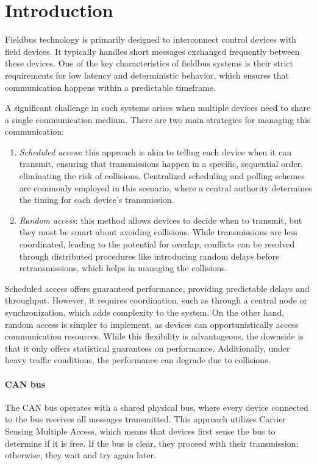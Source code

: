 \section{Introduction}

Fieldbus technology is primarily designed to interconnect control devices with field devices. 
It typically handles short messages exchanged frequently between these devices.
One of the key characteristics of fieldbus systems is their strict requirements for low latency and deterministic behavior, which ensures that communication happens within a predictable timeframe.

A significant challenge in such systems arises when multiple devices need to share a single communication medium.
There are two main strategies for managing this communication:
\begin{enumerate}
    \item \textit{Scheduled access}: this approach is akin to telling each device when it can transmit, ensuring that transmissions happen in a specific, sequential order, eliminating the risk of collisions. 
        Centralized scheduling and polling schemes are commonly employed in this scenario, where a central authority determines the timing for each device's transmission.
    \item \textit{Random access}: this method allows devices to decide when to transmit, but they must be smart about avoiding collisions. 
        While transmissions are less coordinated, leading to the potential for overlap, conflicts can be resolved through distributed procedures like introducing random delays before retransmissions, which helps in managing the collisions.
\end{enumerate}
\noindent Scheduled access offers guaranteed performance, providing predictable delays and throughput. 
However, it requires coordination, such as through a central node or synchronization, which adds complexity to the system. 
On the other hand, random access is simpler to implement, as devices can opportunistically access communication resources. 
While this flexibility is advantageous, the downside is that it only offers statistical guarantees on performance. 
Additionally, under heavy traffic conditions, the performance can degrade due to collisions.

\paragraph*{CAN bus}
The CAN bus operates with a shared physical bus, where every device connected to the bus receives all messages transmitted. 
This approach utilizes Carrier Sensing Multiple Access, which means that devices first sense the bus to determine if it is free. 
If the bus is clear, they proceed with their transmission; otherwise, they wait and try again later.

